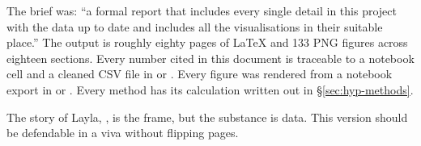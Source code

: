 The brief was: ``a formal report that includes every single
detail in this project with the data up to date and includes all the
visualisations in their suitable place.'' The output is roughly
eighty pages of LaTeX and 133 PNG figures across eighteen sections.
Every number cited in this document is traceable to a notebook cell
and a cleaned CSV file in  or .
Every figure was rendered from a notebook export in  or
. Every method has its calculation written out in
{\S}\ref{sec:hyp-methods}.

The story of Layla, , is the frame, but the substance
is data. This version should be defendable in a viva
without flipping pages.
